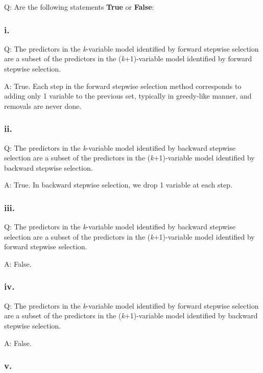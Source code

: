 \documentclass[
]{article}
\begin{document}
Q: Are the following statements \textbf{True} or \textbf{False}:

\hypertarget{i.-5}{%
\subsubsection{i.}\label{i.-5}}

Q: The predictors in the \emph{k}-variable model identified by forward
stepwise selection are a subset of the predictors in the
(\emph{k}+1)-variable model identified by forward stepwise selection.

A: True. Each step in the forward stepwise selection method corresponds
to adding only 1 variable to the previous set, typically in greedy-like
manner, and removals are never done.

\hypertarget{ii.-5}{%
\subsubsection{ii.}\label{ii.-5}}

Q: The predictors in the \emph{k}-variable model identified by backward
stepwise selection are a subset of the predictors in the
(\emph{k}+1)-variable model identified by backward stepwise selection.

A: True. In backward stepwise selection, we drop 1 variable at each
step.

\hypertarget{threeciii}{%
\subsubsection{iii.}\label{threeciii}}

Q: The predictors in the \emph{k}-variable model identified by backward
stepwise selection are a subset of the predictors in the
(\emph{k}+1)-variable model identified by forward stepwise selection.

A: False.

\hypertarget{threeciv}{%
\subsubsection{iv.}\label{threeciv}}

Q: The predictors in the \emph{k}-variable model identified by forward
stepwise selection are a subset of the predictors in the
(\emph{k}+1)-variable model identified by backward stepwise selection.

A: False.

\hypertarget{v.}{%
\subsubsection{v.}\label{v.}}
\end{document}
